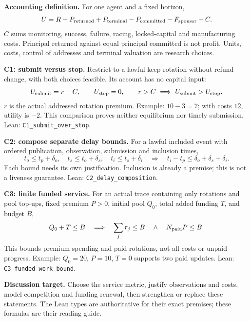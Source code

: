 \documentclass[12pt]{article}
\begin{document}
\textbf{Accounting definition.} For one agent and a fixed horizon,
\[
 U=R+P_{\rm returned}+P_{\rm terminal}
       -P_{\rm committed}-F_{\rm sponsor}-C.
\]
$C$ sums monitoring, success, failure, racing, locked-capital and manufacturing
costs. Principal returned against equal principal committed is not profit.
Units, costs, control of addresses and terminal valuation are research choices.

\textbf{C1: submit versus stop.} Restrict to a lawful keep rotation without
refund change, with both choices feasible. Its account has no capital input:
\[
 U_{\rm submit}=r-C,\qquad U_{\rm stop}=0,
 \qquad r>C\ \Longrightarrow\ U_{\rm submit}>U_{\rm stop}.
\]
$r$ is the actual addressed rotation premium. Example: $10-3=7$;
with costs $12$, utility is $-2$. This comparison proves neither equilibrium
nor timely submission. Lean: \texttt{C1\_submit\_over\_stop}.

\textbf{C2: compose separate delay bounds.} For a lawful included event with
ordered publication, observation, submission and inclusion times,
\[
 t_o\le t_p+\delta_o,\quad
 t_s\le t_o+\delta_s,\quad
 t_i\le t_s+\delta_i
 \quad\Longrightarrow\quad
 t_i-t_p\le\delta_o+\delta_s+\delta_i.
\]
Each bound needs its own justification. Inclusion is already a premise;
this is not a liveness guarantee. Lean: \texttt{C2\_delay\_composition}.

\textbf{C3: finite funded service.} For an actual trace containing only
rotations and pool top-ups, fixed premium $P>0$, initial pool $Q_0$,
total added funding $T$, and budget $B$,
\[
 Q_0+T\le B
 \quad\Longrightarrow\quad
 \sum_j r_j\le B\quad\land\quad N_{\rm paid}P\le B.
\]
This bounds premium spending and paid rotations, not all costs or unpaid
progress. Example: $Q_0=20$, $P=10$, $T=0$ supports two paid updates.
Lean: \texttt{C3\_funded\_work\_bound}.

\textbf{Discussion target.} Choose the service metric, justify observations
and costs, model competition and funding renewal, then strengthen or replace
these statements. The Lean types are authoritative for their exact premises;
these formulas are their reading guide.
\end{document}
